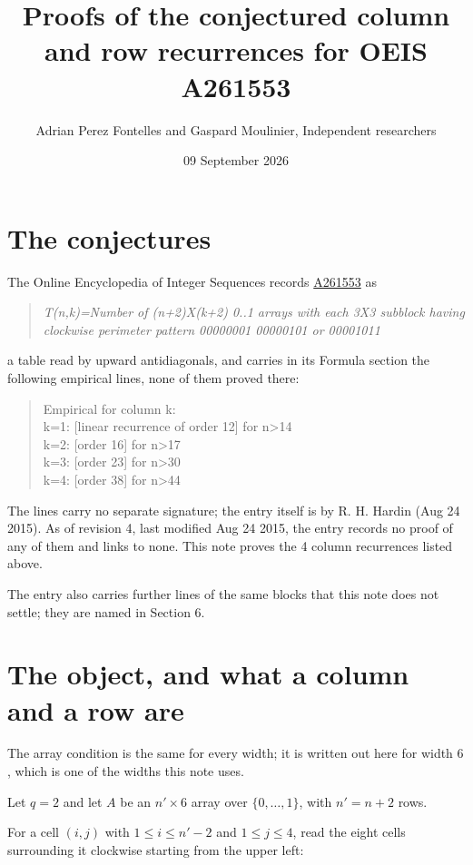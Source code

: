 \documentclass[11pt]{article}
\title{Proofs of the conjectured column and row recurrences for OEIS A261553}
\author{Adrian Perez Fontelles and Gaspard Moulinier, Independent researchers}
\date{09 September 2026}
\theoremstyle{definition}
\begin{document}
\maketitle
\section{The conjectures}

The Online Encyclopedia of Integer Sequences records \href{https://oeis.org/A261553}{A261553} as

\begin{quote}\itshape T(n,k)=Number of (n+2)X(k+2) 0..1 arrays with each 3X3 subblock having clockwise perimeter pattern 00000001 00000101 or 00001011\end{quote}

a table read by upward antidiagonals, and carries in its Formula section the following empirical lines, none of them proved there:

\begin{quote}\ttfamily Empirical for column k:\\
k=1: [linear recurrence of order 12] for n>14\\k=2: [order 16] for n>17\\k=3: [order 23] for n>30\\k=4: [order 38] for n>44\end{quote}

The lines carry no separate signature; the entry itself is by R. H. Hardin (Aug 24 2015). As of revision 4, last modified Aug 24 2015, the entry records no proof of any of them and links to none. This note proves the 4 column recurrences listed above.

The entry also carries further lines of the same blocks that this note does not settle; they are named in Section 6.

\section{The object, and what a column and a row are}

The array condition is the same for every width; it is written out here for width $6$, which is one of the widths this note uses.

Let $q = 2$ and let $A$ be an $n' \times 6$ array over $\{0,\dots,1\}$, with $n' = n + 2$ rows.

For a cell $(i,j)$ with $1 \le i \le n'-2$ and $1 \le j \le 4$, read the eight cells surrounding it clockwise starting from the upper left:
\end{document}
